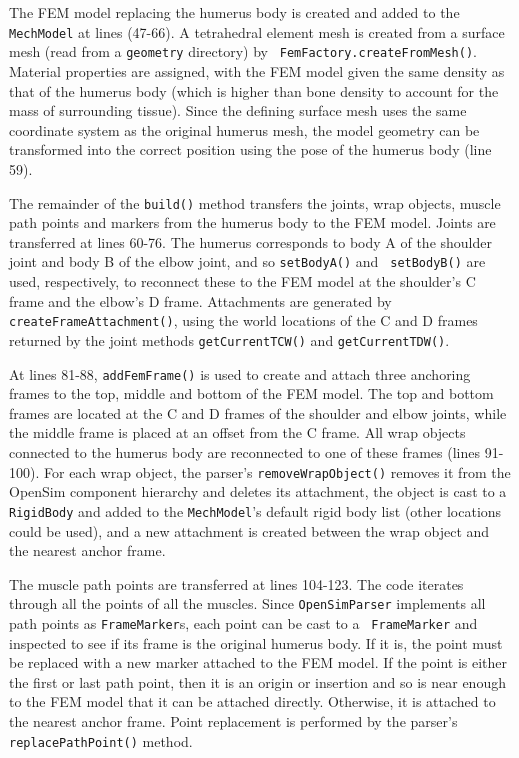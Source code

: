 The FEM model replacing the humerus body is created and added to the {\tt
MechModel} at lines (47-66). A tetrahedral element mesh is created from a
surface mesh (read from a {\tt geometry} directory) by {\tt
FemFactory.createFromMesh()}. Material properties are assigned, with the FEM
model given the same density as that of the humerus body (which is higher than
bone density to account for the mass of surrounding tissue). Since the defining
surface mesh uses the same coordinate system as the original humerus mesh, the
model geometry can be transformed into the correct position using the pose of
the humerus body (line 59).

The remainder of the {\tt build()} method transfers the joints, wrap objects,
muscle path points and markers from the humerus body to the FEM model.  Joints
are transferred at lines 60-76. The humerus corresponds to body A of the
shoulder joint and body B of the elbow joint, and so {\tt setBodyA()} and {\tt
setBodyB()} are used, respectively, to reconnect these to the FEM model at the
shoulder's C frame and the elbow's D frame.  Attachments are generated by {\tt
createFrameAttachment()}, using the world locations of the C and D frames
returned by the joint methods {\tt getCurrentTCW()} and {\tt getCurrentTDW()}.

At lines 81-88, {\tt addFemFrame()} is used to create and attach three
anchoring frames to the top, middle and bottom of the FEM model. The top and
bottom frames are located at the C and D frames of the shoulder and elbow joints,
while the middle frame is placed at an offset from the C frame. All wrap
objects connected to the humerus body are reconnected to one of these frames
(lines 91-100). For each wrap object, the parser's {\tt removeWrapObject()}
removes it from the OpenSim component hierarchy and deletes its attachment, the
object is cast to a {\tt RigidBody} and added to the {\tt MechModel}'s default
rigid body list (other locations could be used), and a new attachment is
created between the wrap object and the nearest anchor frame.

The muscle path points are transferred at lines 104-123. The code iterates
through all the points of all the muscles. Since {\tt OpenSimParser} implements
all path points as {\tt FrameMarker}s, each point can be cast to a {\tt
FrameMarker} and inspected to see if its frame is the original humerus body. If
it is, the point must be replaced with a new marker attached to the FEM model.
If the point is either the first or last path point, then it is an origin or
insertion and so is near enough to the FEM model that it can be attached
directly. Otherwise, it is attached to the nearest anchor frame. Point
replacement is performed by the parser's {\tt replacePathPoint()} method.


